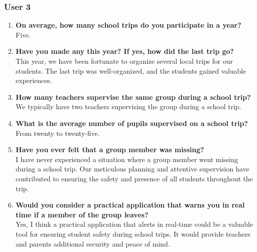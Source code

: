 \subsubsection*{User 3}
\begin{enumerate}
\item \textbf{On average, how many school trips do you participate in a year?}
\\ Five.
\item \textbf{Have you made any this year? If yes, how did the last trip go?}
\\ This year, we have been fortunate to organize several local trips for our students. The last trip was well-organized, and the students gained valuable experiences.
\item \textbf{How many teachers supervise the same group during a school trip?}
\\ We typically have two teachers supervising the group during a school trip.
\item \textbf{What is the average number of pupils supervised on a school trip?}
\\ From twenty to twenty-five.
\item \textbf{Have you ever felt that a group member was missing?}
\\ I have never experienced a situation where a group member went missing during a school trip. Our meticulous planning and attentive supervision have contributed to ensuring the safety and presence of all students throughout the trip.
\item \textbf{Would you consider a practical application that warns you in real time if a member of the group leaves?}
\\ Yes, I think a practical application that alerts in real-time could be a valuable tool for ensuring student safety during school trips. It would provide teachers and parents additional security and peace of mind.
\end{enumerate}

